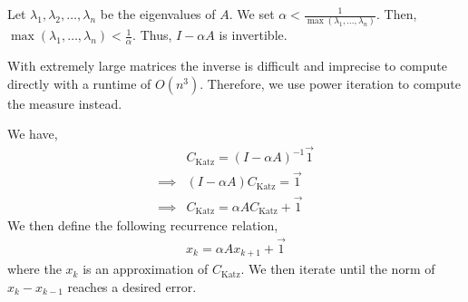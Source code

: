 \documentclass{article}
\begin{document}
Let $\lambda_1, \lambda_2, \dots, \lambda_n$ be the eigenvalues of $A$. We set $\alpha < \frac{1}{\max(\lambda_1, \dots, \lambda_n)}$.
Then, $\max(\lambda_1, \dots, \lambda_n) < \frac{1}{\alpha}$. Thus, $I - \alpha A$ is invertible.



With extremely large matrices the inverse is difficult and imprecise to compute directly with a runtime of $O(n^3)$.
Therefore, we use power iteration to compute the measure instead.

We have,
\begin{align*}
    & C_{\textrm{Katz}} = (I - \alpha A)^{-1} \overrightarrow{1} \\
    \implies & (I - \alpha A) C_{\textrm{Katz}} = \overrightarrow{1} \\
    \implies & C_{\textrm{Katz}} = \alpha A C_{\textrm{Katz}} + \overrightarrow{1}
\end{align*}
We then define the following recurrence relation,
\begin{align*}
    x_k = \alpha A x_{k+1} + \overrightarrow{1}
\end{align*} where the $x_k$ is an approximation of $C_{\textrm{Katz}}$. We then iterate until the norm of $x_{k} - x_{k-1}$ reaches a desired error.
\end{document}

